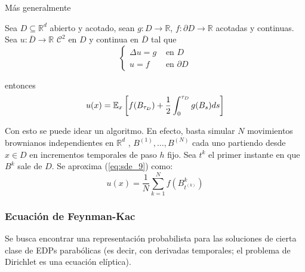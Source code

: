 Más generalmente 

\begin{theorem}
        Sea $D \subseteq \mathbb{R}^{d}$ abierto y acotado, sean $g : D \to \mathbb{R}$, $f : \partial D \to  \mathbb{R}$ 
        acotadas y continuas. Sea $u : \overline{D} \to  \mathbb{R}$ $\mathcal{C}^2$ en $D$ y continua en 
        $\overline{D}$ tal que 
        \begin{equation*}
                \begin{cases}
                        \Delta u = g & \text{ en } D \\
                        u = f & \text{ en } \partial D
                \end{cases}
        \end{equation*}

        entonces 
        \begin{equation*}
                u(x) 
                = \mathbb{E}_{x} \left[ f(B_{\tau_D}) + \frac{1}{2} \int_{0}^{\tau_D} g(B_s) ds \right]
        \end{equation*}
\end{theorem}

Con esto se puede idear un algoritmo. En efecto, basta simular $N$ movimientos brownianos independientes 
en $\mathbb{R}^{d}$ , $B^{(1)}, \ldots, B^{(N)}$ cada uno partiendo desde $x \in D$ en incrementos temporales 
de paso $h$ fijo. Sea $t^{k}$ el primer instante en que $B^{k}$ sale de $D$. Se aproxima (\ref{eq:sde_9}) 
como: 
\begin{equation*}
        u(x) = \frac{1}{N} \sum_{k=1}^{N} f(B_{t^{(k)}}^{k}) 
\end{equation*}

\subsubsection{Ecuación de Feynman-Kac}

Se busca encontrar una representación probabilista para las soluciones de cierta clase de EDPs 
parabólicas (es decir, con derivadas temporales; el problema de Dirichlet es una ecuación elíptica). 

